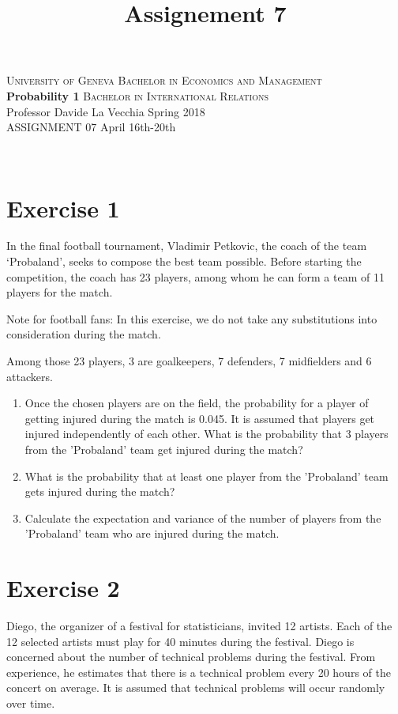 \documentclass[12pt,thmsa]{article}
\title{Assignement 7}
\begin{document}
\noindent \textsc{University of Geneva}     \hfill \textsc{Bachelor in Economics and Management} \\
\textbf{Probability 1}                      \hfill \textsc{Bachelor in International Relations} \\
Professor Davide La Vecchia                 \hfill Spring 2018  \\
ASSIGNMENT 07                               \hfill   April 16th-20th



\noindent
\makebox[\linewidth]{\rule{\textwidth}{0.4pt}}\\[1.5ex]


\section*{Exercise 1}

In the final football tournament, Vladimir Petkovic, the coach of the team `Probaland', seeks to compose the best team possible. Before starting the competition, the coach has 23 players, among whom he can form a team of 11 players for the match.
\medskip


Note for football fans: In this exercise, we do not take any substitutions into consideration during the match.
\medskip

Among those 23 players, 3 are goalkeepers, 7 defenders, 7 midfielders and 6 attackers.
\begin{enumerate}
\item Once the chosen players are on the field, the probability for a player of getting injured during the match is 0.045. It is assumed that players get injured
independently of each other. What is the probability that 3 players from the 'Probaland' team get injured during the match?
\item What is the probability that at least one player from the 'Probaland' team gets injured during the match?
\item Calculate the expectation and variance of the number of players from the 'Probaland' team who are injured during the match.
\end{enumerate}




\section*{Exercise 2}
Diego, the organizer of a festival for statisticians, invited 12 artists. Each of the 12 selected artists must play for 40 minutes during the festival. Diego is concerned about the number of technical problems during the festival. From experience, he estimates that there is a technical problem every 20 hours of the concert on average. It is assumed that technical problems will occur randomly over time.
\end{document}
